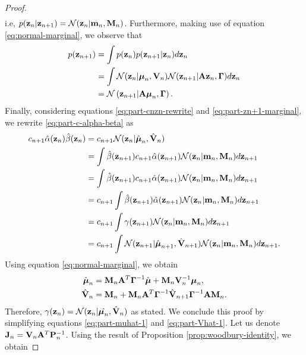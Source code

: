 \documentclass[11pt]{article}
\numberwithin{equation}{section}
\newcommand{\z}{{\bf z}}
\newcommand{\N}{\mathcal{N}}
\begin{document}
\begin{proof}
\begin{align}
	\end{align}	
	i.e, $p(\z_n \vert \z_{n+1}) = \N(\z_n \vert {\bf m}_n, {\bf M}_n)$. Furthermore, making use of equation \eqref{eq:normal-marginal}, we observe that
	\begin{align}
		p(\z_{n+1}) &= \int p(\z_n) p(\z_{n+1} \vert \z_n) d\z_n\\
					&= \int \N(\z_n \vert\boldsymbol\mu_n, {\bf V}_n) \N(\z_{n+1} \vert {\bf A}\z_n, \boldsymbol\Gamma) d\z_n\\
					&= \N\left(\z_{n+1} \vert {\bf A}\boldsymbol\mu_n, \boldsymbol\Gamma\right) \label{eq:part-zn+1-marginal}.
	\end{align}
	Finally, considering equations \eqref{eq:part-cnzn-rewrite} and \eqref{eq:part-zn+1-marginal}, we rewrite \eqref{eq:part-c-alpha-beta} as
	\begin{align}
		c_{n+1}\hat\alpha(\z_n)\hat\beta(\z_n) &= c_{n+1} \N(\z_{n} \vert \hat{\boldsymbol\mu}_n, \hat{\bf V}_n)\\
		&= \int \hat\beta(\z_{n+1}) c_{n+1} \hat\alpha(\z_{n+1})\N(\z_n \vert {\bf m}_n, {\bf M}_n) d\z_{n+1}\\
		&= \int \hat\beta(\z_{n+1}) c_{n+1} \hat\alpha(\z_{n+1})\N(\z_n \vert {\bf m}_n, {\bf M}_n)d\z_{n+1}\\
		&= c_{n+1}\int \hat\beta(\z_{n+1}) \hat\alpha(\z_{n+1})\N(\z_n \vert {\bf m}_n, {\bf M}_n)d\z_{n+1}\\
		&= c_{n+1}\int \gamma(\z_{n+1})\N(\z_n \vert {\bf m}_n, {\bf M}_n) d\z_{n+1}\\
		&= c_{n+1}\int \N(\z_{n+1} \vert \hat{\boldsymbol\mu}_{n+1}, \hat{\bf V}_{n+1})\N(\z_n \vert {\bf m}_n, {\bf M}_n)d\z_{n+1}.
	\end{align}
	Using equation \eqref{eq:normal-marginal}, we obtain
	\begin{align}
		\hat{\boldsymbol{\mu}}_n &= {\bf M}_n {\bf A}^T \boldsymbol\Gamma ^{-1} \hat{\boldsymbol{\mu}} + {\bf M}_n {\bf V}_n^{-1} \boldsymbol\mu_n \label{eq:part-muhat-1},\\
		\hat{{\bf V}}_n&= {\bf M}_n + {\bf M}_n {\bf A}^T \boldsymbol{\Gamma}^{-1} \hat{\bf V}_{n+1}\boldsymbol\Gamma^{-1}{\bf A}{\bf M}_n \label{eq:part-Vhat-1}.
	\end{align}
	Therefore, $\gamma(\z_n) = \N(\z_n \vert \hat{\boldsymbol{\mu}_n}, \hat {\bf V}_n)$ as stated. 
	We conclude this proof by simplifying equations \eqref{eq:part-muhat-1} and \eqref{eq:part-Vhat-1}.  Let us denote ${\bf J}_n = {\bf V}_n{\bf A}^T{\bf P}_n^{-1}$. Using the result of Proposition \ref{prop:woodbury-identity}, we obtain

\end{proof}
\end{document}
